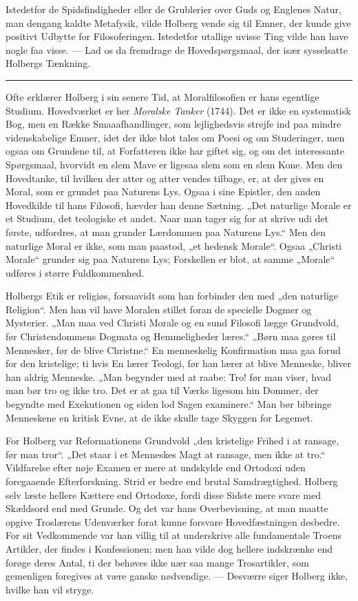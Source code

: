 \documentclass[12pt,a4paper,openany]{book}
\newcommand{\opage}[1]{\marginnote{\footnotesize\textit{[#1]}}}
\begin{document}
Istedetfor de Spidsfindigheder eller de Grublerier over Guds og Englenes Natur,
man dengang kaldte Metafysik, vilde Holberg vende sig til Emner, der kunde give
positivt Udbytte for Filosoferingen. Istedetfor utallige uvisse Ting vilde han
have nogle faa visse. --- Lad os da fremdrage de Hovedspørgsmaal, der især
sysselsatte Holbergs Tænkning.

\begin{center}\rule{2cm}{0.4pt}\end{center}

Ofte erklærer Holberg i sin senere Tid, at Moralfilosofien er hans egentlige
Studium. Hovedværket er her \textit{Moralske Tanker} (1744). Det er ikke en
systematisk Bog, men en Række Smaaafhandlinger, som lejlighedsvis strejfe ind
paa mindre videnskabelige Emner, idet der ikke blot tales om Poesi og om
Studeringer, men ogsaa om Grundene til, at Forfatteren ikke har giftet sig, og
om det interessante Spørgsmaal, hvorvidt en slem Mave er ligesaa slem som en
slem Kone. Men den Hovedtanke, til hvilken der atter og atter vendes tilbage,
er, at der gives en Moral, som er grundet paa Naturens Lys. Ogsaa i sine
Epistler, den anden Hovedkilde
\setcounter{footnote}{0}%
\opage{9}til hans Filosofi, hævder han denne Sætning. „Det naturlige Morale er
et Studium, det teologiske et andet. Naar man tager sig for at skrive udi det
første, udfordres, at man grunder Lærdommen paa Naturens Lys.“ Men den
naturlige Moral er ikke, som man paastod, „et hedensk Morale“. Ogsaa „Christi
Morale“ grunder sig paa Naturens Lys; Forskellen er blot, at samme „Morale“
udføres i større Fuldkommenhed.

Holbergs Etik er religiøs, forsaavidt som han forbinder den med „den naturlige
Religion“. Men han vil have Moralen stillet foran de specielle Dogmer og
Mysterier. „Man maa ved Christi Morale og en sund Filosofi lægge Grundvold, før
Christendommens Dogmata og Hemmeligheder læres.“ „Børn maa gøres til Mennesker,
før de blive Christne.“ En menneskelig Konfirmation maa gaa forud for den
kristelige; ti hvis En lærer Teologi, før han lærer at blive Menneske, bliver
han aldrig Menneske. „Man begynder med at raabe: Tro! før man viser, hvad man
bør tro og ikke tro. Det er at gaa til Værks ligesom hin Dommer, der begyndte
med Exekutionen og siden lod Sagen examinere.“ Man bør bibringe Menneskene en
kritisk Evne, at de ikke skulle tage Skyggen for Legemet.

For Holberg var Reformationens Grundvold „den kristelige Frihed i at ransage,
før man tror“. „Det staar i et Menneskes Magt at ransage, men ikke at tro.“
Vildfarelse efter nøje Examen er mere at undskylde end Ortodoxi uden
foregaaende Efterforskning. Strid er bedre end brutal Samdrægtighed. Holberg
selv læste hellere Kættere end Ortodoxe, fordi disse Sidste mere svare med
Skældsord end med Grunde. Og det var hans Overbevisning, at man maatte opgive
Troslærens Udenværker forat kunne forsvare Hovedfæstningen desbedre. For sit
Vedkommende var han villig til at underskrive alle fundamentale Troens
Artikler, der findes i Konfessionen; men han vilde dog hellere indskrænke end
forøge deres Antal, ti der behøves ikke nær saa mange Trosartikler, som
gemenligen foregives at være ganske nødvendige. --- Desværre siger Holberg
ikke, hvilke han vil stryge.
\end{document}
